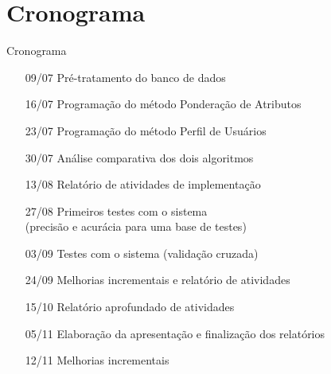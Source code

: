 \section[Cronograma]{Cronograma}
\begin{frame}{Cronograma}
\begin{itemize}
	\item[09/07] Pré-tratamento do banco de dados
 	\item[16/07] Programação do método Ponderação de Atributos
 	\item[23/07] Programação do método Perfil de Usuários
 	\item[30/07] Análise comparativa dos dois algoritmos
 	\item[]
 	\item[13/08] Relatório de atividades de implementação
 	\item[27/08] Primeiros testes com o sistema \\(precisão e acurácia para uma base de testes)
 	\item[]
 	\item[03/09] Testes com o sistema (validação cruzada)
 	\item[24/09] Melhorias incrementais e relatório de atividades
 	\item[]
 	\item[15/10] Relatório aprofundado de atividades
 	\item[]
 	\item[05/11] Elaboração da apresentação e finalização dos relatórios
 	\item[12/11] Melhorias incrementais
\end{itemize}
\end{frame}